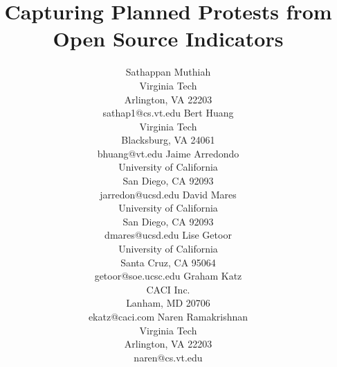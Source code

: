 \documentclass[letterpaper]{article}
\begin{document}
\newcommand{\narenc}[1]{[{\color{red} Naren writes: \it #1}]}
\newcommand{\sathappanc}[1]{[{\color{blue} Sathappan writes: \it #1}]}
\newcommand{\then}{\Rightarrow}
\newcommand{\softor}{\operatornamewithlimits{\tilde{\vee}}}
\newcommand{\softand}{\operatornamewithlimits{\tilde{\wedge}}}
\newcommand{\softthen}{\operatornamewithlimits{\tilde{\then}}}
\newcommand{\softneg}{\operatornamewithlimits{\tilde{\neg}}}
\title{Capturing Planned Protests from Open Source Indicators}
\author{
Sathappan Muthiah\\
Virginia Tech\\
Arlington, VA 22203\\
sathap1@cs.vt.edu
\And
Bert Huang\\
       Virginia Tech\\
       Blacksburg, VA 24061\\
       bhuang@vt.edu
       \And
Jaime Arredondo\\
       University of California\\
       San Diego, CA 92093\\
       jarredon@ucsd.edu
\AND 
David Mares\\
       University of California\\
       San Diego, CA 92093\\
       dmares@ucsd.edu
       \And
Lise Getoor\\
       University of California\\
       Santa Cruz, CA 95064\\
       getoor@soe.ucsc.edu
       \And
Graham Katz\\
       CACI Inc.\\
       Lanham, MD 20706\\
       ekatz@caci.com
       \And
Naren Ramakrishnan\\
       Virginia Tech\\
       Arlington, VA 22203\\
       naren@cs.vt.edu
}
\maketitle
\begin{abstract}
\begin{quote}

\end{quote}
\end{abstract}
\label{intro}

\end{document}
